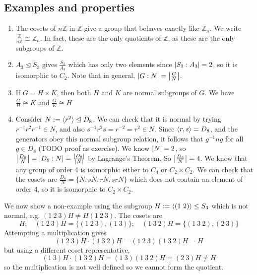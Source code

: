 \subsection{Examples and properties}
\begin{enumerate}
	\item The cosets of \(n\mathbb Z\) in \(\mathbb Z\) give a group that behaves exactly like \(\mathbb Z_n\).
	      We write \(\frac{\mathbb Z}{n\mathbb Z} \cong \mathbb Z_n\).
	      In fact, these are the only quotients of \(\mathbb Z\), as these are the only subgroups of \(\mathbb Z\).
	\item \(A_3 \trianglelefteq S_3\) gives \(\frac{S_3}{A_3}\) which has only two elements since \(\abs{S_3 : A_3} = 2\), so it is isomorphic to \(C_2\).
	      Note that in general, \(\abs{G:N} = \abs{\frac{G}{N}}\).
	\item If \(G = H \times K\), then both \(H\) and \(K\) are normal subgroups of \(G\).
	      We have \(\frac{G}{H} \cong K\) and \(\frac{G}{K} \cong H\) %
	\item Consider \(N := \langle{} r^2 \rangle \trianglelefteq D_8\).
	      We can check that it is normal by trying \(r^{-1}r^2r^{-1} \in N\), and also \(s^{-1}r^2s = r^{-2} = r^2 \in N\).
	      Since \(\langle{} r, s \rangle = D_8\), and the generators obey this normal subgroup relation, it follows that \(g^{-1}ng\) for all \(g \in D_8\) (TODO proof as exercise).
	      We know \(\abs{N} = 2\), so \(\abs{\frac{D_8}{N}} = \abs{D_8 : N} = \frac{\abs{D_8}}{\abs{N}}\) by Lagrange's Theorem.
	      So \(\abs{\frac{D_8}{N}} = 4\).
	      We know that any group of order 4 is isomorphic either to \(C_4\) or \(C_2 \times C_2\).
	      We can check that the cosets are \(\frac{D_8}{N} = \{ N, sN, rN, srN \}\) which does not contain an element of order 4, so it is isomorphic to \(C_2 \times C_2\).
\end{enumerate}
We now show a non-example using the subgroup \(H := \langle{} (1\ 2) \rangle \leq S_3\) which is not normal, e.g.
\((1\ 2\ 3) H \neq H (1\ 2\ 3)\).
The cosets are
\[
	H;\quad (1\ 2\ 3)H = \{(1\ 2\ 3), (1\ 3)\};\quad (1\ 3\ 2)H = \{(1\ 3\ 2), (2\ 3)\}
\]
Attempting a multiplication gives
\[
	(1\ 2\ 3)H \cdot (1\ 3\ 2) H = (1\ 2\ 3) (1\ 3\ 2) H = H
\]
but using a different coset representative,
\[
	(1\ 3)H \cdot (1\ 3\ 2) H = (1\ 3)(1\ 3\ 2) H = (2\ 3)H \neq H
\]
so the multiplication is not well defined so we cannot form the quotient.

